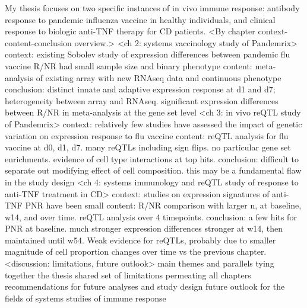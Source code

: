 \begin{outline}
\1 My thesis focuses on two specific instances of in vivo immune response: antibody response to pandemic influenza vaccine in healthy individuals, and clinical response to biologic anti-TNF therapy for CD patients.
\1 <By chapter context-content-conclusion overview.>
    \2 <ch 2: systems vaccinology study of Pandemrix>
        \3 context: existing Sobolev study of expression differences between pandemic flu vaccine R/NR had small sample size and binary phenotype
        \3 content: meta-analysis of existing array with new RNAseq data and continuous phenotype
        \3 conclusion: distinct innate and adaptive expression response at d1 and d7; heterogeneity between array and RNAseq. significant expression differences between R/NR in meta-analysis at the gene set level
    \2 <ch 3: in vivo reQTL study of Pandemrix>
        \3 context: relatively few studies have assessed the impact of genetic variation on expression response to flu vaccine
        \3 content: reQTL analysis for flu vaccine at d0, d1, d7. many reQTLs including sign flips. no particular gene set enrichments. evidence of cell type interactions at top hits.
        \3 conclusion: difficult to separate out modifying effect of cell composition. this may be a fundamental flaw in the study design
    \2 <ch 4: systems immunology and reQTL study of response to anti-TNF treatment in CD>
        \3 context: studies on expression signatures of anti-TNF PNR have been small
        \3 content: R/NR comparison with larger n, at baseline, w14, and over time. reQTL analysis over 4 timepoints. 
        \3 conclusion: a few hits for PNR at baseline. much stronger expression differences stronger at w14, then maintained until w54. Weak evidence for reQTLs, probably due to smaller magnitude of cell proportion changes over time vs the previous chapter.
    \2 <discussion: limitations, future outlook>
        \3 main themes and parallels tying together the thesis
        \3 shared set of limitations permeating all chapters
        \3 recommendations for future analyses and study design
        \3 future outlook for the fields of systems studies of immune response%

\end{outline}
